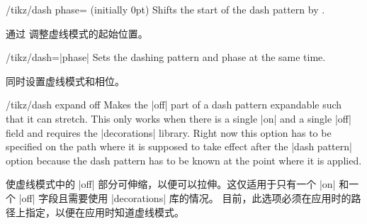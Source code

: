 \begin{key}{/tikz/dash phase= (initially 0pt)}
    Shifts the start of the dash pattern by .
    
    通过  调整虚线模式的起始位置。
%
\begin{codeexample}[]
\begin{tikzpicture}[dash pattern=on 20pt off 10pt]
  \draw[dash phase=0pt] (0pt,3pt) -- (3.5cm,3pt);
  \draw[dash phase=10pt] (0pt,0pt) -- (3.5cm,0pt);
\end{tikzpicture}
\end{codeexample}
\end{key}

\begin{key}{/tikz/dash=|phase|}
    Sets the dashing pattern and phase at the same time.
    
    同时设置虚线模式和相位。
%
\begin{codeexample}[]
\begin{tikzpicture}
  \draw [dash=on 20pt off 10pt phase  0pt] (0pt,3pt) -- (3.5cm,3pt);
  \draw [dash=on 20pt off 10pt phase 10pt] (0pt,0pt) -- (3.5cm,0pt);
\end{tikzpicture}
\end{codeexample}
\end{key}

\begin{key}{/tikz/dash expand off}
    Makes the |off| part of a dash pattern expandable such that it can stretch.
    This only works when there is a single |on| and a single |off| field and
    requires the |decorations| library. Right now this option has to be
    specified on the path where it is supposed to take effect after the
    |dash pattern| option because the dash pattern has to be known at the point
    where it is applied.
    
    使虚线模式中的 |off| 部分可伸缩，以便可以拉伸。这仅适用于只有一个 |on| 和一个 |off| 字段且需要使用 |decorations| 库的情况。
目前，此选项必须在应用时的路径上指定，以便在应用时知道虚线模式。
%
\begin{codeexample}[preamble={\usetikzlibrary{decorations}}]
\end{codeexample}
\end{key}

